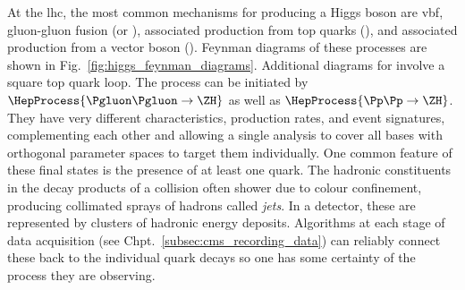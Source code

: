 At the \acrshort{lhc}, the most common mechanisms for producing a Higgs boson are \acrfull{vbf}, gluon-gluon fusion (\ggF or \ggH), associated production from top quarks (\ttH), and associated production from a vector boson (\VH). Feynman diagrams of these processes are shown in Fig.~\ref{fig:higgs_feynman_diagrams}. Additional diagrams for \ggH involve a square top quark loop. The \ZH process can be initiated by $\HepProcess{\Pgluon\Pgluon\to \ZH}$ as well as $\HepProcess{\Pp\Pp \to \ZH}$. They have very different characteristics, production rates, and event signatures, complementing each other and allowing a single analysis to cover all bases with orthogonal parameter spaces to target them individually. One common feature of these final states is the presence of at least one quark. The hadronic constituents in the decay products of a collision often shower due to colour confinement, producing collimated sprays of hadrons called \emph{\glspl{jet}}. In a detector, these are represented by clusters of hadronic energy deposits. Algorithms at each stage of data acquisition (see Chpt.~\ref{subsec:cms_recording_data}) can reliably connect these back to the individual quark decays so one has some certainty of the process they are observing.


